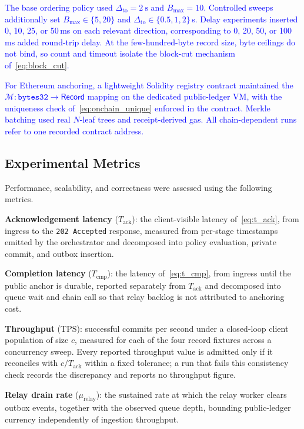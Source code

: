 \documentclass[final,5p,times,twocolumn]{elsarticle}
\begin{document}
\textcolor{blue}{The base ordering policy used $\Delta_{\mathrm{to}}=\SI{2}{\second}$ and $B_{\max}=10$. Controlled sweeps additionally set $B_{\max}\in\{5,20\}$ and $\Delta_{\mathrm{to}}\in\{0.5,1,2\}$\,s. Delay experiments inserted 0, 10, 25, or 50\,ms on each relevant direction, corresponding to 0, 20, 50, or 100\,ms added round-trip delay. At the few-hundred-byte record size, byte ceilings do not bind, so count and timeout isolate the block-cut mechanism of~\eqref{eq:block_cut}.}

\textcolor{blue}{For Ethereum anchoring, a lightweight Solidity registry contract maintained the $\mathcal{M}:\texttt{bytes32}\!\rightarrow\!\textsf{Record}$ mapping on the dedicated public-ledger VM, with the uniqueness check of~\eqref{eq:onchain_unique} enforced in the contract. Merkle batching used real $N$-leaf trees and receipt-derived gas. All chain-dependent runs refer to one recorded contract address.}

\subsection{\textbf{Experimental Metrics}}
Performance, scalability, and correctness were assessed using the following metrics.

\textbf{Acknowledgement latency} ($T_{\mathrm{ack}}$): the client-visible latency of~\eqref{eq:t_ack}, from ingress to the \texttt{202~Accepted} response, measured from per-stage timestamps emitted by the orchestrator and decomposed into policy evaluation, private commit, and outbox insertion.

\textbf{Completion latency} ($T_{\mathrm{cmp}}$): the latency of~\eqref{eq:t_cmp}, from ingress until the public anchor is durable, reported separately from $T_{\mathrm{ack}}$ and decomposed into queue wait and chain call so that relay backlog is not attributed to anchoring cost.

\textbf{Throughput} ($\mathrm{TPS}$): successful commits per second under a closed-loop client population of size $c$, measured for each of the four record fixtures across a concurrency sweep. Every reported throughput value is admitted only if it reconciles with $c/T_{\mathrm{ack}}$ within a fixed tolerance; a run that fails this consistency check records the discrepancy and reports no throughput figure.

\textbf{Relay drain rate} ($\mu_{\mathrm{relay}}$): the sustained rate at which the relay worker clears outbox events, together with the observed queue depth, bounding public-ledger currency independently of ingestion throughput.
\end{document}
